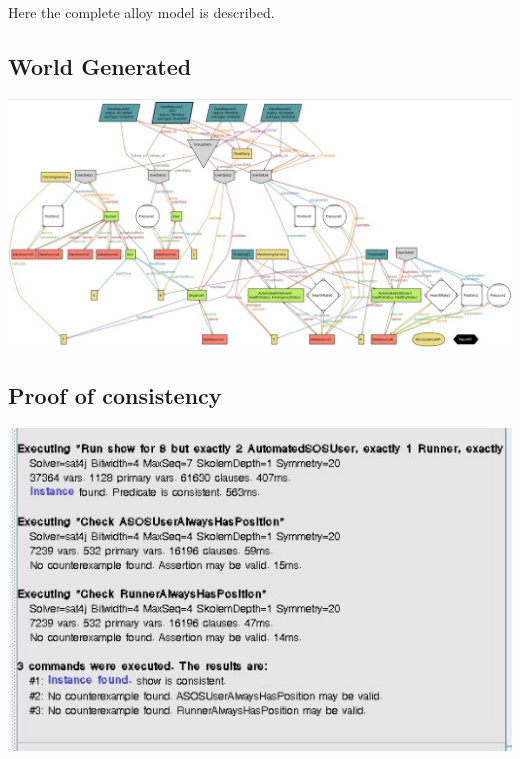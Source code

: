 Here the complete alloy model is described.


\subsection{World Generated}
\includegraphics[angle=90, scale = 0.63]{../Alloy/worldGenerated.jpg}\\
\subsection{Proof of consistency}
{
\centering
\includegraphics{../Alloy/proofOfConcept.jpg}\\
}
